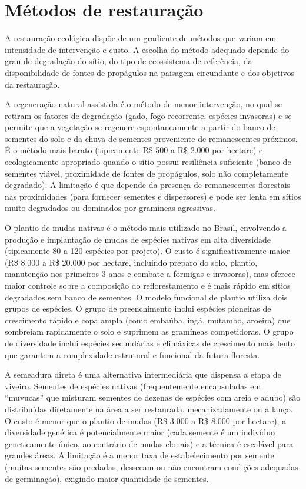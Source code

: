 \documentclass[
  portuguese,
  11pt,
  a4paper,
  open=any]{scrbook}
\begin{document}
\section{Métodos de restauração}\label{muxe9todos-de-restaurauxe7uxe3o}

A restauração ecológica dispõe de um gradiente de métodos que variam em
intensidade de intervenção e custo. A escolha do método adequado depende
do grau de degradação do sítio, do tipo de ecossistema de referência, da
disponibilidade de fontes de propágulos na paisagem circundante e dos
objetivos da restauração.

A regeneração natural assistida é o método de menor intervenção, no qual
se retiram os fatores de degradação (gado, fogo recorrente, espécies
invasoras) e se permite que a vegetação se regenere espontaneamente a
partir do banco de sementes do solo e da chuva de sementes proveniente
de remanescentes próximos. É o método mais barato (tipicamente R\$ 500 a
R\$ 2.000 por hectare) e ecologicamente apropriado quando o sítio possui
resiliência suficiente (banco de sementes viável, proximidade de fontes
de propágulos, solo não completamente degradado). A limitação é que
depende da presença de remanescentes florestais nas proximidades (para
fornecer sementes e dispersores) e pode ser lenta em sítios muito
degradados ou dominados por gramíneas agressivas.

O plantio de mudas nativas é o método mais utilizado no Brasil,
envolvendo a produção e implantação de mudas de espécies nativas em alta
diversidade (tipicamente 80 a 120 espécies por projeto). O custo é
significativamente maior (R\$ 8.000 a R\$ 20.000 por hectare, incluindo
preparo do solo, plantio, manutenção nos primeiros 3 anos e combate a
formigas e invasoras), mas oferece maior controle sobre a composição do
reflorestamento e é mais rápido em sítios degradados sem banco de
sementes. O modelo funcional de plantio utiliza dois grupos de espécies.
O grupo de preenchimento inclui espécies pioneiras de crescimento rápido
e copa ampla (como embaúba, ingá, mutambo, aroeira) que sombreiam
rapidamente o solo e suprimem as gramíneas competidoras. O grupo de
diversidade inclui espécies secundárias e climáxicas de crescimento mais
lento que garantem a complexidade estrutural e funcional da futura
floresta.

A semeadura direta é uma alternativa intermediária que dispensa a etapa
de viveiro. Sementes de espécies nativas (frequentemente encapsuladas em
``muvucas'' que misturam sementes de dezenas de espécies com areia e
adubo) são distribuídas diretamente na área a ser restaurada,
mecanizadamente ou a lanço. O custo é menor que o plantio de mudas (R\$
3.000 a R\$ 8.000 por hectare), a diversidade genética é potencialmente
maior (cada semente é um indivíduo geneticamente único, ao contrário de
mudas clonais) e a técnica é escalável para grandes áreas. A limitação é
a menor taxa de estabelecimento por semente (muitas sementes são
predadas, dessecam ou não encontram condições adequadas de germinação),
exigindo maior quantidade de sementes.
\end{document}
